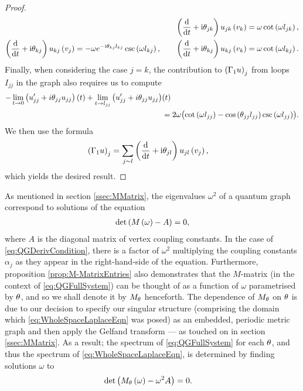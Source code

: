 \begin{proof}
\begin{align*}
		&\qquad \left( \dfrac{\mathrm{d}}{\mathrm{d}t}+\mathrm{i}\theta_{jk} \right)u_{jk}\left( v_k \right) = \omega\cot\left( \omega l_{jk} \right), \\
		\left( \dfrac{\mathrm{d}}{\mathrm{d}t}+\mathrm{i}\theta_{kj} \right)u_{kj}\left( v_j \right) = -\omega e^{-\mathrm{i}\theta_{kj}l_{kj}}\csc\left( \omega l_{kj} \right), 
		&\qquad \left( \dfrac{\mathrm{d}}{\mathrm{d}t}+\mathrm{i}\theta_{kj} \right)u_{kj}\left( v_k \right) = \omega\cot\left( \omega l_{kj} \right).
	\end{align*}
	Finally, when considering the case $j=k$, the contribution to $\left( \Gamma_1 u \right)_j$ from loops $I_{jj}$ in the graph also requires us to compute
	\begin{align*}
		-\lim_{t\rightarrow0}\left( u_{jj}'+i\theta_{jj}u_{jj} \right)(t) + \lim_{t\rightarrow l_{jj}}\left( u_{jj}'+i\theta_{jj}u_{jj} \right) & (t) \\
		&= 2\omega\bigl( \cot\left( \omega l_{jj} \right) - \cos\left( \theta_{jj}l_{jj} \right)\csc\left( \omega l_{jj} \right) \bigr).	
	\end{align*}
	We then use the formula
	\begin{align*}
		\left( \Gamma_1 u \right)_j &= \sum_{j\sim l} \left( \dfrac{\mathrm{d}}{\mathrm{d}t}+\mathrm{i}\theta_{jl} \right)u_{jl}\left( v_j \right),
	\end{align*}
	which yields the desired result.
\end{proof}

As mentioned in section \ref{ssec:MMatrix}, the eigenvalues $\omega^2$ of a quantum graph correspond to solutions of the equation
\begin{align*}
	\det\left(  M\left( \omega \right) - A  \right) = 0,
\end{align*}
where $A$ is the diagonal matrix of vertex coupling constants.
In the case of \eqref{eq:QGDerivCondition}, there is a factor of $\omega^2$ multiplying the coupling constants $\alpha_j$ as they appear in the right-hand-side of the equation.
Furthermore, proposition \ref{prop:M-MatrixEntries} also demonstrates that the $M$-matrix (in the context of \eqref{eq:QGFullSystem}) can be thought of as a function of $\omega$ parametrised by $\theta$, and so we shall denote it by $M_{\theta}$ henceforth.
The dependence of $M_\theta$ on $\theta$ is due to our decision to specify our singular structure (comprising the domain which \eqref{eq:WholeSpaceLaplaceEqn} was posed) as an embedded, periodic metric graph and then apply the Gelfand transform --- as touched on in section \ref{ssec:MMatrix}.
As a result; the spectrum of \eqref{eq:QGFullSystem} for each $\theta$, and thus the spectrum of \eqref{eq:WholeSpaceLaplaceEqn}, is determined by finding solutions $\omega$ to
\begin{align} \label{eq:QGDetSolveCondition}
	\det\left( M_\theta\left( \omega \right) - \omega^2 A \right) &= 0.
\end{align}

